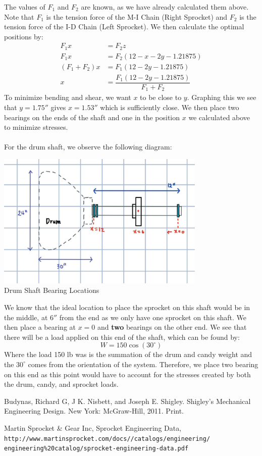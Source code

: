 \documentclass[letterpaper,12pt]{article}
\begin{document}
\noindent The values of $F_1$ and $F_2$ are known, as we have already calculated them above. Note that $F_1$ is the tension force of the M-I Chain (Right Sprocket) and $F_2$ is the tension force of the I-D Chain (Left Sprocket). We then calculate the optimal positions by:
\begin{align*}
    F_1x &= F_2z \\
    F_1x &= F_2(12-x-2y-1.21875) \\
    (F_1 + F_2)x &= F_1(12-2y-1.21875) \\
    x &= \dfrac{F_1(12-2y-1.21875)}{F_1 + F_2}
\end{align*}
To minimize bending and shear, we want $x$ to be close to $y$. Graphing this we see that $y=1.75''$ gives $x=1.53''$ which is sufficiently close. We then place two bearings on the ends of the shaft and one in the position $x$ we calculated above to minimize stresses. \\\\
For the drum shaft, we observe the following diagram:
\begin{center}
\includegraphics[width=10cm]{MECH325ADrum.jpg} \\
Drum Shaft Bearing Locations
\end{center}

\noindent We know that the ideal location to place the sprocket on this shaft would be in the middle, at $6''$ from the end as we only have one sprocket on this shaft. We then place a bearing at $x=0$ and \textbf{two} bearings on the other end. We see that there will be a load applied on this end of the shaft, which can be found by:
\begin{equation*}
    W = 150\cos(30^{\circ})
\end{equation*}
Where the load 150 lb was is the summation of the drum and candy weight and the $30^{\circ}$ comes from the orientation of the system. Therefore, we place two bearing on this end as this point would have to account for the stresses created by both the drum, candy, and sprocket loads.

\begin{thebibliography}{9}
Budynas, Richard G, J K. Nisbett, and Joseph E. Shigley. Shigley's Mechanical Engineering Design. New York: McGraw-Hill, 2011. Print. 

Martin Sprocket \& Gear Inc, Sprocket Engineering Data,
\\\texttt{http://www.martinsprocket.com/docs//catalogs/engineering/\\engineering\%20catalog/sprocket-engineering-data.pdf}
\end{thebibliography}
\end{document}
